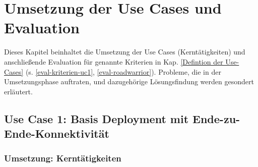 \chapter{Umsetzung der Use Cases und Evaluation} \label{Umsetzung der Use-Cases und Evaluation}
Dieses Kapitel beinhaltet die Umsetzung der Use Cases (\glqq Kerntätigkeiten\grqq{}) und anschließende Evaluation für genannte Kriterien in Kap. \ref{Defintion der Use-Cases} (s. \ref{eval-kriterien-uc1}, \ref{eval-roadwarrior}). Probleme, die in der Umsetzungsphase auftraten, und dazugehörige Lösungsfindung werden gesondert erläutert.

\section{Use Case 1: Basis Deployment mit Ende-zu-Ende-Konnektivität} \label{Use-Case 1: Basis Deployment}
\subsection{Umsetzung: Kerntätigkeiten}

